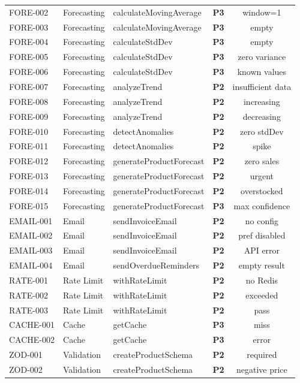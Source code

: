 ﻿\documentclass[12pt,a4paper]{report}
\newcommand{\ptwo}{\textbf{\color{p2orange}P2}}
\newcommand{\pthree}{\textbf{\color{p3blue}P3}}
\begin{document}
\begin{center}
\begin{longtable}{llllc}
  FORE-002 & Forecasting & calculateMovingAverage & \pthree & window=1 \\
  FORE-003 & Forecasting & calculateMovingAverage & \pthree & empty \\
  FORE-004 & Forecasting & calculateStdDev & \pthree & empty \\
  FORE-005 & Forecasting & calculateStdDev & \pthree & zero variance \\
  FORE-006 & Forecasting & calculateStdDev & \pthree & known values \\
  FORE-007 & Forecasting & analyzeTrend & \ptwo & insufficient data \\
  FORE-008 & Forecasting & analyzeTrend & \ptwo & increasing \\
  FORE-009 & Forecasting & analyzeTrend & \ptwo & decreasing \\
  FORE-010 & Forecasting & detectAnomalies & \ptwo & zero stdDev \\
  FORE-011 & Forecasting & detectAnomalies & \ptwo & spike \\
  FORE-012 & Forecasting & generateProductForecast & \ptwo & zero sales \\
  FORE-013 & Forecasting & generateProductForecast & \ptwo & urgent \\
  FORE-014 & Forecasting & generateProductForecast & \ptwo & overstocked \\
  FORE-015 & Forecasting & generateProductForecast & \pthree & max confidence \\
  EMAIL-001 & Email & sendInvoiceEmail & \ptwo & no config \\
  EMAIL-002 & Email & sendInvoiceEmail & \ptwo & pref disabled \\
  EMAIL-003 & Email & sendInvoiceEmail & \ptwo & API error \\
  EMAIL-004 & Email & sendOverdueReminders & \ptwo & empty result \\
  RATE-001 & Rate Limit & withRateLimit & \ptwo & no Redis \\
  RATE-002 & Rate Limit & withRateLimit & \ptwo & exceeded \\
  RATE-003 & Rate Limit & withRateLimit & \ptwo & pass \\
  CACHE-001 & Cache & getCache & \pthree & miss \\
  CACHE-002 & Cache & getCache & \pthree & error \\
  ZOD-001  & Validation & createProductSchema & \ptwo & required \\
  ZOD-002  & Validation & createProductSchema & \ptwo & negative price \\

\end{longtable}
\end{center}
\end{document}
